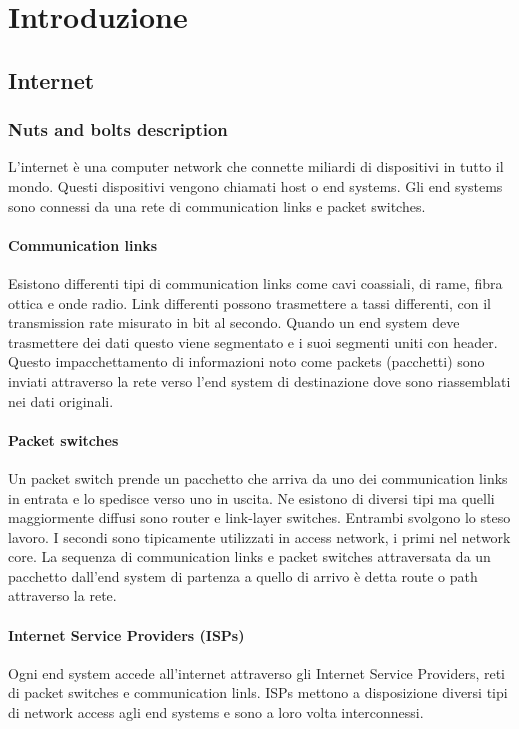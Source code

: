 \chapter{Introduzione}
\section{Internet}
\subsection{Nuts and bolts description}
L'internet \`e una computer network che connette miliardi di dispositivi in tutto il mondo. Questi dispositivi vengono chiamati host o end systems. Gli end systems sono connessi da una rete di communication
links e packet switches.
\subsubsection{Communication links}
 Esistono differenti tipi di communication links come cavi coassiali, di rame, fibra ottica e onde radio. Link differenti possono trasmettere a tassi differenti, con il transmission rate misurato
in bit al secondo. Quando un end system deve trasmettere dei dati questo viene segmentato e  i suoi segmenti uniti con header. Questo impacchettamento di informazioni noto come packets (pacchetti) sono 
inviati attraverso la rete verso l'end system di destinazione dove sono riassemblati nei dati originali. 
\subsubsection{Packet switches}
Un packet switch prende un pacchetto che arriva da uno dei communication links in entrata e lo spedisce verso uno in uscita. Ne esistono di diversi tipi ma quelli maggiormente diffusi sono router e link-layer
switches. Entrambi svolgono lo steso lavoro. I secondi sono tipicamente utilizzati in access network, i primi nel network core. La sequenza di communication links e packet switches attraversata da un pacchetto
dall'end system di partenza a quello di arrivo \`e detta route o path attraverso la rete. 
\subsubsection{Internet Service Providers (ISPs)}
Ogni end system accede all'internet attraverso gli Internet Service Providers, reti di packet switches e communication linls. ISPs mettono a disposizione diversi tipi di network access agli end systems e sono a 
loro volta interconnessi. 
